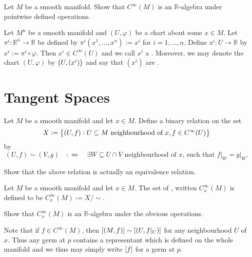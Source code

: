 \begin{exercise}
	Let $M$ be a smooth manifold. Show that $C^\infty(M)$ is an $\mathbb{R}$-algebra under pointwise defined operations.
\end{exercise}

\begin{example}
	Let $M^n$ be a smooth manifold and $(U,\varphi)$ be a chart about some $x \in M$. Let $\pi^i : \mathbb{R}^n \to \mathbb{R}$ be defined by $\pi^i(x^1,\dots,x^n) := x^i$ for $i = 1,\dots,n$. Define $x^i : U \to \mathbb{R}$ by $x^i := \pi^i \circ \varphi$. Then $x^i \in C^\infty(U)$ and we call $x^i$ a . Moreover, we may denote the chart $(U,\varphi)$ by $\del[1]{U,(x^i)}$ and say that $(x^i)$ are . 
\end{example}

\section*{Tangent Spaces}
Let $M$ be a smooth manifold and let $x \in M$. Define a binary relation on the set
\begin{equation*}
	X := \cbr[1]{(U,f) : U \subseteq M \text{ neighbourhood of } x, f \in C^\infty(U)}
\end{equation*}
\noindent by
\begin{equation*}
	(U,f)\sim(V,g) \quad :\Leftrightarrow \quad \exists W \subseteq U \cap V \text{ neighbourhood of $x$, such that } f\vert_W = g\vert_W.
\end{equation*}

\begin{exercise}
	Show that the above relation is actually an equivalence relation.
\end{exercise}

\begin{definition}[Germ]
	Let $M$ be a smooth manifold and let $x \in M$. The set of , written $C^\infty_x(M)$ is defined to be $C^\infty_x(M) := X/{\sim}$.
\end{definition}

\begin{exercise}
	Show that $C^\infty_x(M)$ is an $\mathbb{R}$-algebra under the obvious operations.
\end{exercise}

\begin{remark}
	Note that if $f \in C^\infty(M)$, then $\sbr[0]{(M,f)} \sim \sbr[0]{(U,f\vert_U)}$ for any neighbourhood $U$ of $x$. Thus any germ at $p$ contains a representant which is defined on the whole manifold and we thus may simply write $\sbr[0]{f}$ for a germ at $p$. 
\end{remark}

